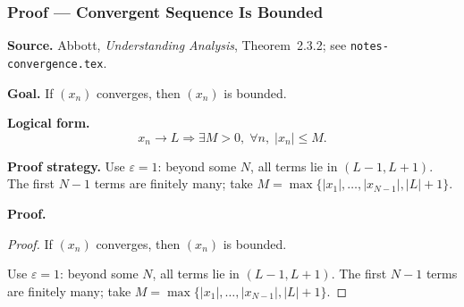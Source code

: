 
\clearpage
{}
\hypertarget{proof-RA-ABB-T-conv-bounded-2}{}

\subsubsection[Convergent Sequence Is Bounded]{Proof --- Convergent Sequence Is Bounded}

\bigskip

\noindent
\textbf{Source.}
Abbott, \emph{Understanding Analysis}, Theorem~2.3.2; see \texttt{notes-convergence.tex}.

\vspace{0.75em}

\noindent
\textbf{Goal.}
If $(x_n)$ converges, then $(x_n)$ is bounded.

\vspace{0.75em}

\noindent
\textbf{Logical form.}
\[
  x_n \to L \Rightarrow \exists M > 0,\; \forall n,\; |x_n| \le M.
\]

\vspace{0.75em}

\noindent
\textbf{Proof strategy.}
Use $\varepsilon = 1$: beyond some $N$, all terms lie in $(L-1, L+1)$. The first $N-1$ terms are finitely many; take $M = \max\{|x_1|,\ldots,|x_{N-1}|, |L|+1\}$.

\vspace{0.75em}

\noindent
\textbf{Proof.}
\begin{proof}
\Claim If $(x_n)$ converges, then $(x_n)$ is bounded.

\Given 

\Goal 

\Strategy Use $\varepsilon = 1$: beyond some $N$, all terms lie in $(L-1, L+1)$. The first $N-1$ terms are finitely many; take $M = \max\{|x_1|,\ldots,|x_{N-1}|, |L|+1\}$.

\medskip


\end{proof}

